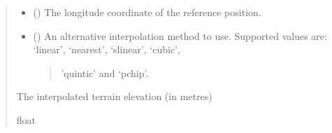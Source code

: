 \documentclass[letterpaper,10pt,english]{sphinxmanual}
\begin{document}
\begin{fulllineitems}
\begin{fulllineitems}
\begin{quote}
\begin{description}
\begin{itemize}
\item {} 
\sphinxAtStartPar
{} () \textendash{} The longitude coordinate of the reference position.

\item {} 
\sphinxAtStartPar
{} () \textendash{} 
\sphinxAtStartPar
An alternative interpolation method to use. Supported
values are: ‘linear’, ‘nearest’, ‘slinear’, ‘cubic’,
\begin{quote}

\sphinxAtStartPar
’quintic’ and ‘pchip’.
\end{quote}


\end{itemize}

\sphinxAtStartPar
The interpolated terrain elevation (in metres)

\sphinxAtStartPar
float

\end{description}\end{quote}

\end{fulllineitems}



\end{fulllineitems}
\end{document}
